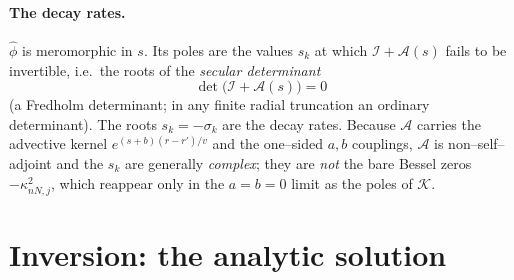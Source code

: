 \documentclass{article}
\begin{document}
\paragraph{The decay rates.} $\widehat\phi$ is meromorphic in $s$. Its poles are
the values $s_k$ at which $\mathcal I+\mathcal A(s)$ fails to be invertible,
i.e.\ the roots of the \emph{secular determinant}
\begin{equation}
\boxed{\;\det\bigl(\mathcal I+\mathcal A(s)\bigr)=0\;}
\label{eq:secular}
\end{equation}
(a Fredholm determinant; in any finite radial truncation an ordinary
determinant). The roots $s_k=-\sigma_k$ are the decay rates. Because
$\mathcal A$ carries the advective kernel $e^{(s+b)(r-r')/v}$ and the one--sided
$a,b$ couplings, $\mathcal A$ is non--self--adjoint and the $s_k$ are generally
\emph{complex}; they are \emph{not} the bare Bessel zeros $-\kappa_{nN,j}^2$,
which reappear only in the $a=b=0$ limit as the poles of $\mathcal K$.

\section{Inversion: the analytic solution}
\end{document}
